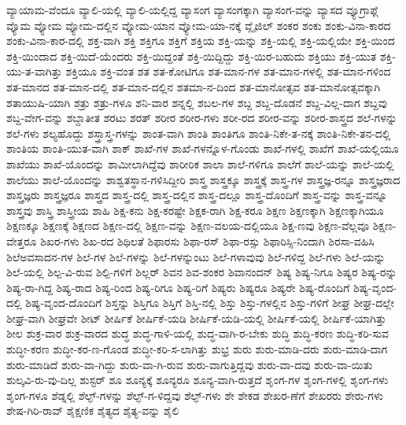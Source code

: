 {ವ್ಯಾಯಾಮ-ವೆಂದೂ
ವ್ಯಾಲಿ-ಯಲ್ಲಿ
ವ್ಯಾಲಿ-ಯಲ್ಲಿದ್ದ
ವ್ಯಾಸಂಗ
ವ್ಯಾಸಂಗಕ್ಕಾಗಿ
ವ್ಯಾಸಂಗ-ವನ್ನು
ವ್ಯಾಸದ
ವ್ಯೂಗ್ರಾಫ್ಗೆ
ವ್ಯೊಮ
ವ್ಯೋಮ
ವ್ಯೋಮ-ದಲ್ಲಿನ
ವ್ಯೋಮ-ಯಾನ
ವ್ಯೋಮ-ಯಾ-ನಕ್ಕೆ
ವ್ಲೈಜಿಲ್
ಶಂಕರ
ಶಂಕು
ಶಂಕು-ವಿನಾ-ಕಾರದ
ಶಂಕು-ವಿನಾ-ಕಾರ-ದಲ್ಲಿ
ಶಕ್ತ-ವಾಗಿ
ಶಕ್ತಿ
ಶಕ್ತಿಗೂ
ಶಕ್ತಿಗೆ
ಶಕ್ತಿಯ
ಶಕ್ತಿ-ಯನ್ನು
ಶಕ್ತಿ-ಯಲ್ಲಿ
ಶಕ್ತಿ-ಯಲ್ಲಿಯೇ
ಶಕ್ತಿ-ಯಿಂದ
ಶಕ್ತಿ-ಯಿಂದಾದ
ಶಕ್ತಿ-ಯಿದೆ-ಯೆಂದರು
ಶಕ್ತಿ-ಯಿದ್ದಂತೆ
ಶಕ್ತಿ-ಯಿದ್ದಿದ್ದು
ಶಕ್ತಿ-ಯಿರ-ಬಹುದು
ಶಕ್ತಿಯು
ಶಕ್ತಿ-ಯುತ
ಶಕ್ತಿ-ಯು-ತ-ವಾಗಿತ್ತು
ಶಕ್ತಿಯೂ
ಶಕ್ತಿ-ವಂತ
ಶತ
ಶತ-ಕೋಟಿಗೂ
ಶತ-ಮಾನ-ಗಳ
ಶತ-ಮಾನ-ಗಳಲ್ಲಿ
ಶತ-ಮಾನ-ಗಳಿಂದ
ಶತ-ಮಾನದ
ಶತ-ಮಾನ-ದಲ್ಲಿ
ಶತ-ಮಾನ-ದಲ್ಲಿನ
ಶತಮಾ-ನ-ದಿಂದ
ಶತ-ಮಾನೋತ್ಸವ
ಶತ-ಮಾನೋತ್ಸವಕ್ಕಾಗಿ
ಶತಾಯುಷಿ-ಯಾಗಿ
ಶತ್ರು
ಶತ್ರು-ಗಳೂ
ಶನಿ-ವಾರ
ಶನ್ನಲ್ಲಿ
ಶಬಲ-ಗಳ
ಶಬ್ದ
ಶಬ್ದ-ದೊಡನೆ
ಶಬ್ದ-ವಿಲ್ಲ-ದಾಗ
ಶಬ್ದವು
ಶಬ್ದ-ವೇಗ-ವನ್ನು
ಶಬ್ದಾತೀತ
ಶರಟು
ಶರತ್
ಶರೀರ
ಶರೀರ-ಗಳು
ಶರೀ-ರದ
ಶರೀರ-ವನ್ನು
ಶರೀರ-ಶಾಸ್ತ್ರದ
ಶಲೆ-ಗಳನ್ನು
ಶಲೆ-ಗಳು
ಶಲ್ಯಹೊದ್ದು
ಶಸ್ತ್ರಾಸ್ತ್ರ-ಗಳನ್ನು
ಶಾಂತ-ವಾಗಿ
ಶಾಂತಿ
ಶಾಂತಿಗೂ
ಶಾಂತಿ-ನಿಕೇ-ತ-ನಕ್ಕೆ
ಶಾಂತಿ-ನಿಕೇ-ತನ-ದಲ್ಲಿ
ಶಾಂತಿಯ
ಶಾಂತಿ-ಯುತ-ವಾಗಿ
ಶಾಕ್
ಶಾಖೆ-ಗಳ
ಶಾಖೆ-ಗಳನ್ನೊಳ-ಗೊಂಡು
ಶಾಖೆ-ಗಳಲ್ಲಿ
ಶಾಖೆಗೆ
ಶಾಖೆ-ಯಲ್ಲಿಯೂ
ಶಾಖೆಯು
ಶಾಖೆ-ಯೊಂದನ್ನು
ಶಾಮೀಲಾಗಿದ್ದೆವು
ಶಾರೀರಿಕ
ಶಾಲಾ
ಶಾಲೆ-ಗಳಿಗೂ
ಶಾಲೆಗೆ
ಶಾಲೆ-ಯನ್ನು
ಶಾಲೆ-ಯಲ್ಲಿ
ಶಾಲೆಯು
ಶಾಲೆ-ಯೊಂದನ್ನು
ಶಾಶ್ವತಸ್ಥಾನ-ಗಳಿಸಿದ್ದೀರಿ
ಶಾಸ್ತ್ರ
ಶಾಸ್ತ್ರಕ್ಕೂ
ಶಾಸ್ತ್ರಕ್ಕೆ
ಶಾಸ್ತ್ರ-ಗಳ
ಶಾಸ್ತ್ರಜ್ಞ-ರನ್ನೂ
ಶಾಸ್ತ್ರಜ್ಞರಾದ
ಶಾಸ್ತ್ರಜ್ಞರು
ಶಾಸ್ತ್ರಜ್ಞರೂ
ಶಾಸ್ತ್ರದ
ಶಾಸ್ತ್ರ-ದಲ್ಲಿ
ಶಾಸ್ತ್ರ-ದಲ್ಲಿನ
ಶಾಸ್ತ್ರ-ದಲ್ಲೂ
ಶಾಸ್ತ್ರ-ದೊಂದಿಗೆ
ಶಾಸ್ತ್ರ-ವನ್ನು
ಶಾಸ್ತ್ರ-ವನ್ನೂ
ಶಾಸ್ತ್ರವು
ಶಾಸ್ತ್ರಿ
ಶಾಸ್ತ್ರೀಯ
ಶಾಹಿ
ಶಿಕ್ಷ-ಕನು
ಶಿಕ್ಷ-ಕರಷ್ಟೇ
ಶಿಕ್ಷಕ-ರಾಗಿ
ಶಿಕ್ಷ-ಕರೂ
ಶಿಕ್ಷಣ
ಶಿಕ್ಷಣಕ್ಕಾಗಿ
ಶಿಕ್ಷಣಕ್ಕಾಗಿಯೂ
ಶಿಕ್ಷಣಕ್ಕೂ
ಶಿಕ್ಷಣಕ್ಕೆ
ಶಿಕ್ಷಣದ
ಶಿಕ್ಷಣ-ದಲ್ಲಿ
ಶಿಕ್ಷಣ-ವನ್ನು
ಶಿಕ್ಷಣ-ವಲಯ-ದಲ್ಲಿಯೂ
ಶಿಕ್ಷ-ಣವು
ಶಿಕ್ಷಣ-ವೆಲ್ಲವೂ
ಶಿಕ್ಷಣ-ವೇತ್ತರೂ
ಶಿಖರ-ಗಳು
ಶಿಖ-ರದ
ಶಿಥಿಲತೆ
ಶಿಫಾರಸು
ಶಿಫಾ-ರಸ್
ಶಿಫಾ-ರಸ್ಸು
ಶಿಫಾರಿಸ್ಸಿ-ನಿಂದಾಗಿ
ಶಿರಸಾ-ವಹಿಸಿ
ಶಿಲೆಅವಸಾದನ-ಗಳ
ಶಿಲೆ-ಗಳ
ಶಿಲೆ-ಗಳನ್ನು
ಶಿಲೆ-ಗಳನ್ನುಂಟು
ಶಿಲೆ-ಗಳಾವುವು
ಶಿಲೆ-ಗಳಿದ್ದ
ಶಿಲೆ-ಗಳು
ಶಿಲೆ-ಯನ್ನು
ಶಿಲೆ-ಯಲ್ಲಿ
ಶಿಲ್ಪ-ವಿ-ರುವ
ಶಿಲ್ಪಿ-ಗಳಿಗೆ
ಶಿಲ್ಲರ್
ಶಿವನ
ಶಿವ-ಶಂಕರ
ಶಿವಾನಂದನ್
ಶಿಷ್ಯ
ಶಿಷ್ಯ-ನಿಗೂ
ಶಿಷ್ಯರ
ಶಿಷ್ಯ-ರನ್ನು
ಶಿಷ್ಯ-ರಾ-ಗಿದ್ದ
ಶಿಷ್ಯ-ರಾದ
ಶಿಷ್ಯ-ರಿಂದ
ಶಿಷ್ಯ-ರಿಗೂ
ಶಿಷ್ಯ-ರಿಗೆ
ಶಿಷ್ಯರು
ಶಿಷ್ಯರೂ
ಶಿಷ್ಯರೇ
ಶಿಷ್ಯ-ರೊಂದಿಗೆ
ಶಿಷ್ಯ-ವೃಂದ-ದಲ್ಲಿ
ಶಿಷ್ಯ-ವೃಂದ-ದೊಂದಿಗೆ
ಶಿಸ್ತನ್ನು
ಶಿಸ್ತಿಗೂ
ಶಿಸ್ತಿಗೆ
ಶಿಸ್ತಿ-ನಲ್ಲಿ
ಶಿಸ್ತು
ಶಿಸ್ತು-ಗಳಲ್ಲಿನ
ಶಿಸ್ತು-ಗಳಿಗೆ
ಶೀಘ್ರ
ಶೀಘ್ರ-ದಲ್ಲೇ
ಶೀಘ್ರ-ವಾಗಿ
ಶೀಘ್ರವೇ
ಶೀಟ್
ಶೀರ್ಷಿಕೆ
ಶೀರ್ಷಿಕೆ-ಯಡಿ
ಶೀರ್ಷಿಕೆ-ಯಡಿ-ಯಲ್ಲಿ
ಶೀರ್ಷಿಕೆ-ಯಲ್ಲಿ
ಶೀರ್ಷಿಕೆ-ಯಾಗಿತ್ತು
ಶೀಲ
ಶುಕ್ರ-ವಾರ
ಶುಕ್ರ-ವಾರದ
ಶುದ್ಧ
ಶುದ್ಧ-ಗಾಳಿ-ಯಲ್ಲಿ
ಶುದ್ಧ-ವಾಗಿ-ರ-ಬೇಕು
ಶುದ್ಧಿ
ಶುದ್ಧಿ-ಕರಣ
ಶುದ್ಧಿ-ಕರಿ-ಸುವ
ಶುದ್ಧೀ-ಕರಣ
ಶುದ್ಧೀ-ಕರ-ಣ-ಗೊಂಡ
ಶುದ್ಧೀ-ಕರಿ-ಸ-ಲಾಗಿತ್ತು
ಶುಭ್ರ
ಶುರು
ಶುರು-ಮಾಡಿ-ದರು
ಶುರು-ಮಾಡಿ-ದಾಗ
ಶುರು-ಮಾಡಿದೆ
ಶುರು-ವಾ-ಗಿದ್ದು
ಶುರು-ವಾ-ಗಿ-ರುವ
ಶುರು-ವಾಗುತ್ತಿದ್ದವು
ಶುರು-ವಾ-ದವು
ಶುರು-ವಾ-ಯಿತು
ಶುಲ್ಕವಿ-ರು-ವು-ದಿಲ್ಲ
ಶುಸ್ಟರ್
ಶೂ
ಶೂನ್ಯಕ್ಕೆ
ಶೂನ್ಯರೂ
ಶೂನ್ಯ-ವಾಗಿ-ರುತ್ತದೆ
ಶೃಂಗ-ಗಳ
ಶೃಂಗ-ಗಳಲ್ಲಿ
ಶೃಂಗ-ಗಳು
ಶೃಂಗ-ಗಳೂ
ಶೆಡ್ನಲ್ಲಿ
ಶೆಲ್ಫ್-ಗಳನ್ನು
ಶೆಲ್ಫ್-ಗ-ಳಿದ್ದವು
ಶೆಲ್ಫ್-ಗಳು
ಶೇ
ಶೇಕಡ
ಶೇಖರ-ಣೆಗೆ
ಶೇಖರರು
ಶೇರು-ಗಳು
ಶೇಷ-ಗಿರಿ-ರಾವ್
ಶೈಕ್ಷಣಿಕ
ಶೈತ್ಯದ
ಶೈತ್ಯ-ವನ್ನು
ಶೈಲಿ
}
